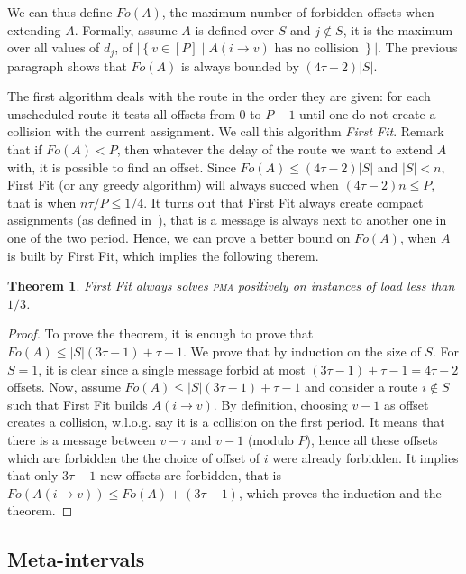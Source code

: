 \documentclass[10pt, conference, letterpaper]{IEEEtran}
\newtheorem{theorem}{Theorem}
\newcommand\pma{\textsc{pma}\xspace}
\begin{document}
We can thus define $Fo(A)$, the maximum number of forbidden offsets when 
extending $A$. Formally, assume $A$ is defined over $S$ and $j\notin S$, 
it is the maximum over all values of $d_j$, of $|\left\{ v \in [P] \mid A(i \rightarrow v) \text{ has no collision }\right\}|$. The previous paragraph shows that $Fo(A)$ is always bounded by $(4 \tau -2)|S|$. 


The first algorithm deals with the route in the order they are given:  for each unscheduled route it tests all offsets from $0$ to $P-1$ until one do not create a collision with the current assignment.
We call this algorithm \emph{First Fit}. Remark that if $Fo(A) < P$, then whatever the delay of the route we want to extend $A$ with, it is possible to find an offset. Since $Fo(A) \leq (4 \tau -2)|S|$ and $|S| < n$, First Fit (or any greedy algorithm) will always succed 
when $(4 \tau -2)n \leq P$, that is when $ n\tau /P \leq 1/4$.
It turns out that First Fit always create compact assignments (as defined in~\cite{barth2018deterministic}), that is a message is always next to another one in one of the two period. Hence, we can prove a better bound on $Fo(A)$, when $A$ is built by First Fit, which
implies the following therem.

\begin{theorem}
First Fit always solves \pma positively on instances of load less than $1/3$. 
\end{theorem}
\begin{proof}
To prove the theorem, it is enough to prove that $Fo(A) \leq |S|(3\tau -1) + \tau -1$. 
We prove that by induction on the size of $S$. For $S = 1$, it is clear since a single
message forbid at most $(3\tau -1) + \tau -1 = 4\tau-2$ offsets. Now, assume $Fo(A) \leq |S|(3\tau -1) + \tau -1$ and consider a route $i \notin S$ such that First Fit builds $A(i \rightarrow v )$. By definition, choosing $v-1$ as offset creates a collision, w.l.o.g. 
say it is a collision on the first period. It means that there is a message between 
$v - \tau $ and $v-1$ (modulo $P$), hence all these offsets which are forbidden 
the the choice of offset of $i$ were already forbidden. It implies that only $3\tau -1$ new offsets are forbidden, that is $Fo(A(i \rightarrow v)) \leq Fo(A) + (3\tau -1)$,
which proves the induction and the theorem.
\end{proof}

\subsection{Meta-intervals}
\end{document}

